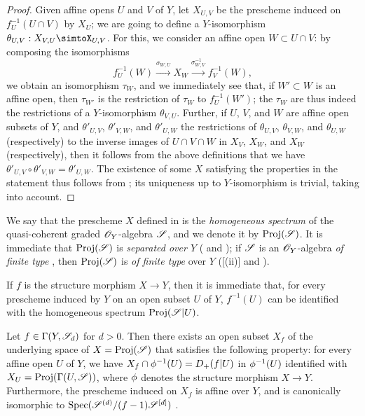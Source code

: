 \begin{proof}
Given affine opens $U$ and $V$ of $Y$, let $X_{U,V}$ be the prescheme induced on $f_U^{-1}(U\cap V)$ by $X_U$;
we are going to define a $Y$-isomorphism $\theta_{U,V}:X_{V,U}\simtoX_{U,V}$.
For this, we consider an affine open $W\subset U\cap V$:
by composing the isomorphisms
\[
  f_U^{-1}(W)
  \xrightarrow{\sigma_{W,U}} X_W
  \xrightarrow{\sigma_{W,V}^{-1}} f_V^{-1}(W),
\]
we obtain an isomorphism $\tau_W$, and we immediately see that, if $W'\subset W$ is an affine open, then $\tau_{W'}$ is the restriction of $\tau_W$ to $f_U^{-1}(W')$;
the $\tau_W$ are thus indeed the restrictions of a $Y$-isomorphism $\theta_{V,U}$.
Further, if $U$, $V$, and $W$ are affine open subsets of $Y$, and $\theta'_{U,V}$, $\theta'_{V,W}$, and $\theta'_{U,W}$ the restrictions of $\theta_{U,V}$, $\theta_{V,W}$, and $\theta_{U,W}$ (respectively) to the inverse images of $U\cap V\cap W$ in $X_V$, $X_W$, and $X_W$ (respectively), then it follows from the above definitions that we have $\theta'_{U,V}\circ\theta'_{V,W}=\theta'_{U,W}$.
The existence of some $X$ satisfying the properties in the statement thus follows from ;
its uniqueness up to $Y$-isomorphism is trivial, taking  into account.
\end{proof}

\begin{env}[3.1.3]
\label{II.3.1.3}
We say that the prescheme $X$ defined in  is the \emph{homogeneous spectrum} of the quasi-coherent graded $\mathscr{O}_Y$-algebra $\mathscr{S}$, and we denote it by $\operatorname{Proj}(\mathscr{S})$.
It is immediate that $\operatorname{Proj}(\mathscr{S})$ is \emph{separated over $Y$} ( and );
if $\mathscr{S}$ is an $\mathscr{O}_Y$-algebra \emph{of finite type} , then $\operatorname{Proj}(\mathscr{S})$ is \emph{of finite type} over $Y$ ([(ii)] and ).

If $f$ is the structure morphism $X\to Y$, then it is immediate that, for every prescheme induced by $Y$ on an open subset $U$ of $Y$, $f^{-1}(U)$ can be identified with the homogeneous spectrum $\operatorname{Proj}(\mathscr{S}|U)$.
\end{env}

\begin{proposition}[3.1.4]
\label{II.3.1.4}
Let $f\in\Gamma(Y,\mathscr{S}_d)$ for $d>0$.
Then there exists an open subset $X_f$ of the underlying space of $X=\operatorname{Proj}(\mathscr{S})$ that satisfies the following property:
for every affine open $U$ of $Y$, we have $X_f\cap\phi^{-1}(U)=D_+(f|U)$ in $\phi^{-1}(U)$ identified with $X_U=\operatorname{Proj}(\Gamma(U,\mathscr{S}))$, where $\phi$ denotes the structure morphism $X\to Y$.
Furthermore, the prescheme induced on $X_f$ is affine over $Y$, and is canonically isomorphic to $\operatorname{Spec}(\mathscr{S}^{(d)}/(f-1)\mathscr{S}^{[d]})$ .
\end{proposition}


